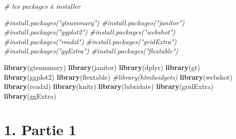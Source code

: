 \documentclass[
]{article}
\author{}
\date{\vspace{-2.5em}}
\newenvironment{Shaded}{\begin{snugshade}}{\end{snugshade}}
\newcommand{\AttributeTok}[1]{\textcolor[rgb]{0.13,0.29,0.53}{#1}}
\newcommand{\CommentTok}[1]{\textcolor[rgb]{0.56,0.35,0.01}{\textit{#1}}}
\newcommand{\ConstantTok}[1]{\textcolor[rgb]{0.56,0.35,0.01}{#1}}
\newcommand{\FunctionTok}[1]{\textcolor[rgb]{0.13,0.29,0.53}{\textbf{#1}}}
\newcommand{\NormalTok}[1]{#1}
\newcommand{\SpecialCharTok}[1]{\textcolor[rgb]{0.81,0.36,0.00}{\textbf{#1}}}
\begin{document}

\setcounter{tocdepth}{4}        
\renewcommand{\contentsname}{\textcolor{blue}{Table des Matières}}

\textcolor{black}{\tableofcontents} \newpage

\begin{Shaded}
\end{Shaded}

\begin{Shaded}
\begin{Highlighting}[]
\CommentTok{\# les packages à installer }

\CommentTok{\#install.packages("gtsummary")}
\CommentTok{\#install.packages("janitor")}
\CommentTok{\#install.packages("ggplot2")}
\CommentTok{\#install.packages("webshot")}
\CommentTok{\#install.packages("readxl")}
\CommentTok{\#install.packages("gridExtra")}
\CommentTok{\#install.packages("ggExtra")}
\CommentTok{\#install.packages("flextable")}
\end{Highlighting}
\end{Shaded}

\begin{Shaded}
\begin{Highlighting}[]
\FunctionTok{library}\NormalTok{(gtsummary)}
\FunctionTok{library}\NormalTok{(janitor)}
\FunctionTok{library}\NormalTok{(dplyr)}
\FunctionTok{library}\NormalTok{(gt)}
\FunctionTok{library}\NormalTok{(ggplot2)}
\FunctionTok{library}\NormalTok{(flextable)}
\CommentTok{\#library(htmlwidgets)}
\FunctionTok{library}\NormalTok{(webshot)}
\FunctionTok{library}\NormalTok{(readxl)}
\FunctionTok{library}\NormalTok{(knitr)}
\FunctionTok{library}\NormalTok{(lubridate)}
\FunctionTok{library}\NormalTok{(gridExtra)}
\FunctionTok{library}\NormalTok{(ggExtra)}
\end{Highlighting}
\end{Shaded}

\hypertarget{partie-1}{%
\section{1. Partie 1}\label{partie-1}}
\end{document}
